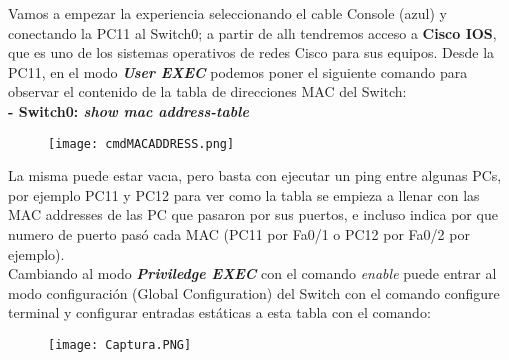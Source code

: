 \documentclass{article}
\begin{document}
{\setlength{\parindent}{1pt} Vamos a empezar la experiencia seleccionando el cable Console (azul) y conectando la PC11 al Switch0; a partir de allı tendremos acceso a \textbf{Cisco IOS}, que es uno de los sistemas operativos de redes Cisco para sus equipos. Desde la PC11, en el modo \textbf{\textit{User EXEC}} podemos poner el siguiente comando para observar el contenido de la tabla de direcciones MAC del Switch:\\

\textbf{- Switch0: \textit{show mac address-table}}\\

\begin{figure}
    \centering
    \texttt{[image: cmdMACADDRESS.png]}
\end{figure}

La misma puede estar vacıa, pero basta con ejecutar un ping entre algunas PCs, por ejemplo PC11 y PC12 para ver como la tabla se empieza a llenar con las  MAC addresses de las PC que pasaron por sus puertos, e incluso indica por que numero de puerto pasó cada MAC (PC11 por Fa0/1 o PC12 por Fa0/2 por ejemplo).\\

Cambiando al modo \textbf{\textit{Priviledge EXEC}} con el comando \textit{enable} puede entrar al modo configuración (Global Configuration) del Switch con el comando configure terminal y configurar entradas estáticas a esta tabla con el comando:\\}

\begin{figure}
    \centering
    \texttt{[image: Captura.PNG]}
\end{figure}
\end{document}
